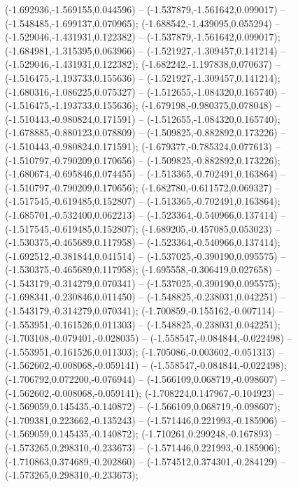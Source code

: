  (-1.692936,-1.569155,0.044596) -- (-1.537879,-1.561642,0.099017) -- (-1.548485,-1.699137,0.070965);
 (-1.688542,-1.439095,0.055294) -- (-1.529046,-1.431931,0.122382) -- (-1.537879,-1.561642,0.099017);
 (-1.684981,-1.315395,0.063966) -- (-1.521927,-1.309457,0.141214) -- (-1.529046,-1.431931,0.122382);
 (-1.682242,-1.197838,0.070637) -- (-1.516475,-1.193733,0.155636) -- (-1.521927,-1.309457,0.141214);
 (-1.680316,-1.086225,0.075327) -- (-1.512655,-1.084320,0.165740) -- (-1.516475,-1.193733,0.155636);
 (-1.679198,-0.980375,0.078048) -- (-1.510443,-0.980824,0.171591) -- (-1.512655,-1.084320,0.165740);
 (-1.678885,-0.880123,0.078809) -- (-1.509825,-0.882892,0.173226) -- (-1.510443,-0.980824,0.171591);
 (-1.679377,-0.785324,0.077613) -- (-1.510797,-0.790209,0.170656) -- (-1.509825,-0.882892,0.173226);
 (-1.680674,-0.695846,0.074455) -- (-1.513365,-0.702491,0.163864) -- (-1.510797,-0.790209,0.170656);
 (-1.682780,-0.611572,0.069327) -- (-1.517545,-0.619485,0.152807) -- (-1.513365,-0.702491,0.163864);
 (-1.685701,-0.532400,0.062213) -- (-1.523364,-0.540966,0.137414) -- (-1.517545,-0.619485,0.152807);
 (-1.689205,-0.457085,0.053023) -- (-1.530375,-0.465689,0.117958) -- (-1.523364,-0.540966,0.137414);
 (-1.692512,-0.381844,0.041514) -- (-1.537025,-0.390190,0.095575) -- (-1.530375,-0.465689,0.117958);
 (-1.695558,-0.306419,0.027658) -- (-1.543179,-0.314279,0.070341) -- (-1.537025,-0.390190,0.095575);
 (-1.698341,-0.230846,0.011450) -- (-1.548825,-0.238031,0.042251) -- (-1.543179,-0.314279,0.070341);
 (-1.700859,-0.155162,-0.007114) -- (-1.553951,-0.161526,0.011303) -- (-1.548825,-0.238031,0.042251);
 (-1.703108,-0.079401,-0.028035) -- (-1.558547,-0.084844,-0.022498) -- (-1.553951,-0.161526,0.011303);
 (-1.705086,-0.003602,-0.051313) -- (-1.562602,-0.008068,-0.059141) -- (-1.558547,-0.084844,-0.022498);
 (-1.706792,0.072200,-0.076944) -- (-1.566109,0.068719,-0.098607) -- (-1.562602,-0.008068,-0.059141);
 (-1.708224,0.147967,-0.104923) -- (-1.569059,0.145435,-0.140872) -- (-1.566109,0.068719,-0.098607);
 (-1.709381,0.223662,-0.135243) -- (-1.571446,0.221993,-0.185906) -- (-1.569059,0.145435,-0.140872);
 (-1.710261,0.299248,-0.167893) -- (-1.573265,0.298310,-0.233673) -- (-1.571446,0.221993,-0.185906);
 (-1.710863,0.374689,-0.202860) -- (-1.574512,0.374301,-0.284129) -- (-1.573265,0.298310,-0.233673);
